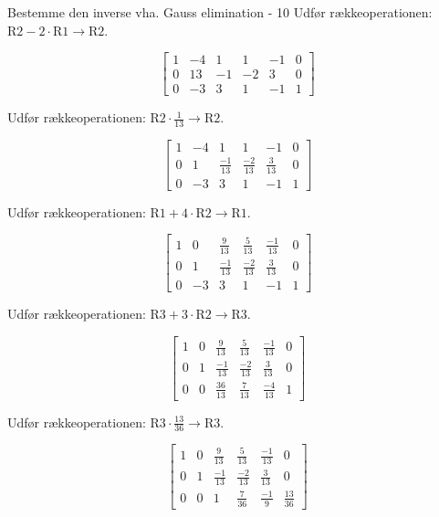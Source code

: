 \documentclass{article}
\begin{document}
\begin{exercise}{Bestemme den inverse vha. Gauss elimination - 10}
	\hint
	Udfør rækkeoperationen: $\text{R2} - 2 \cdot  \text{R1} \to \text{R2}$.
	
	\hint
	\[
	\left[\begin{array}{ccc|ccc}
	1 & -4 & 1 & 1 & -1 & 0 \\ 
	0 & 13 & -1 & -2 & 3 & 0 \\
	0 & -3 & 3 & 1 & -1 & 1 
	\end{array} \right]
	\]
	
	\hint
	Udfør rækkeoperationen: $\text{R2} \cdot \frac{1}{13} \to \text{R2}$.
	
	\hint
	\[
	\left[\begin{array}{ccc|ccc}
	1 & -4 & 1 & 1 & -1 & 0 \\ 
	0 & 1 & \frac{-1}{13} & \frac{-2}{13} & \frac{3}{13} & 0 \\
	0 & -3 & 3 & 1 & -1 & 1 
	\end{array} \right]
	\]
	
	\hint
	Udfør rækkeoperationen: $\text{R1} + 4 \cdot \text{R2} \to \text{R1}$.
	
	\hint
	\[
	\left[\begin{array}{ccc|ccc}
	1 & 0 & \frac{9}{13} & \frac{5}{13} & \frac{-1}{13} & 0 \\ 
	0 & 1 & \frac{-1}{13} & \frac{-2}{13} & \frac{3}{13} & 0 \\
	0 & -3 & 3 & 1 & -1 & 1 
	\end{array} \right]
	\]
	
	\hint
	Udfør rækkeoperationen: $\text{R3} + 3 \cdot \text{R2}  \to \text{R3}$.
	
	\hint
	\[
	\left[\begin{array}{ccc|ccc}
	1 & 0 & \frac{9}{13} & \frac{5}{13} & \frac{-1}{13} & 0 \\ 
	0 & 1 & \frac{-1}{13} & \frac{-2}{13} & \frac{3}{13} & 0 \\
	0 & 0 & \frac{36}{13} & \frac{7}{13} & \frac{-4}{13} & 1 
	\end{array} \right]
	\]
	
	\hint
	Udfør rækkeoperationen: $\text{R3} \cdot \frac{13}{36} \to \text{R3}$.
	
	\hint
	\[
	\left[\begin{array}{ccc|ccc}
	1 & 0 & \frac{9}{13} & \frac{5}{13} & \frac{-1}{13} & 0 \\ 
	0 & 1 & \frac{-1}{13} & \frac{-2}{13} & \frac{3}{13} & 0 \\
	0 & 0 & 1 & \frac{7}{36} & \frac{-1}{9} & \frac{13}{36}
	\end{array} \right]
	\]
	

\end{exercise}
\end{document}
